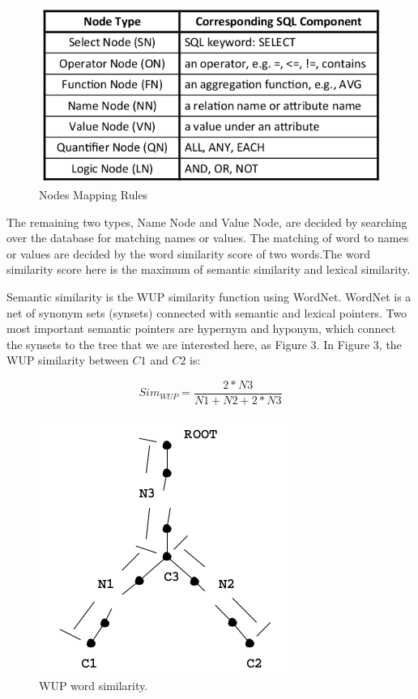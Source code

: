 \documentclass[twocolumn]{article}
\begin{document}
\begin{figure}[ht]
  \centering
  \includegraphics[width=0.9\linewidth]{figures/nodes_mapping_rules.png}
  \caption[caption for nodes mapping rules]{Nodes Mapping Rules\protect\footnotemark}
\end{figure}

The remaining two types, Name Node and Value Node, are decided by searching over the database for matching names or values. The matching of word to names or values are decided by the word similarity score of two words.The word similarity score here is the maximum of semantic similarity and lexical similarity.

Semantic similarity is the WUP similarity\cite{wu1994verbs} function using WordNet. WordNet is a net of synonym sets (synsets) connected with semantic and lexical pointers. Two most important semantic pointers are hypernym and hyponym, which connect the synsets to the tree that we are interested here, as Figure 3. In Figure 3, the WUP similarity between $C1$ and $C2$ is:

$$ Sim_{WUP} = \frac{2*N3}{N1+N2+2*N3} $$

\begin{figure}[ht]
  \centering
  \includegraphics[width=0.7\linewidth]{figures/wordnet_tree.png}
  \caption[caption for wordnet tree]{WUP word similarity.\protect\footnotemark }
\end{figure}
\end{document}
